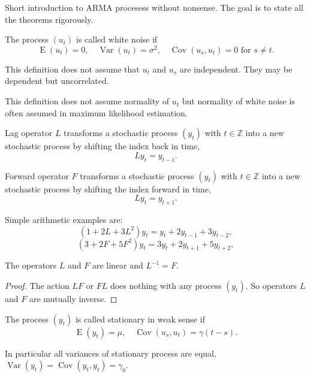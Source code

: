 \documentclass[12pt]{article} %
\DeclareMathOperator{\Cov}{Cov}
\DeclareMathOperator{\Var}{Var}
\DeclareMathOperator{\E}{E}
\def \ZZ{\mathbb{Z}}
\begin{document}
Short introduction to ARMA procesess without nonsense. 
The goal is to state all the theorems rigorously. 

\begin{definition}
The process $(u_t)$ is called white noise if 
\[
\E(u_t) = 0, \quad \Var(u_t) = \sigma^2, \quad \Cov(u_s, u_t) = 0 \text{ for } s\neq t.    
\]
\end{definition}

This definition does not assume that $u_t$ and $u_s$ are independent. 
They may be dependent but uncorrelated. 

This definition does not assume normality of $u_t$ but normality of white noise 
is often assumed in maximum likelihood estimation. 

\begin{definition}
    Lag operator $L$ transforms a stochastic process $(y_t)$ with $t\in \ZZ$ into a 
    new stochastic process by shifting the index back in time,
    \[
            L y_t = y_{t-1}.
    \]
\end{definition}

\begin{definition}
    Forward operator $F$ transforms a stochastic process $(y_t)$ with $t\in \ZZ$ into a 
    new stochastic process by shifting the index forward in time,
    \[
            L y_t = y_{t+1}.
    \]
\end{definition}


Simple arithmetic examples are:
\[
(1 + 2L + 3L^2)y_t = y_t + 2y_{t-1} + 3y_{t-2},   
\]
\[
(3 + 2F + 5F^2)y_t = 3y_t + 2y_{t+1} + 5y_{t+2},
\]

\begin{theorem}
    The operators $L$ and $F$ are linear and $L^{-1} = F$.
\end{theorem}

\begin{proof}
 The action $LF$ or $FL$ does nothing with any process $(y_t)$. 
 So operators $L$ and $F$ are mutually inverse.
\end{proof}


\begin{definition}
    The process $(y_t)$ is called stationary in weak sense if 
    \[
    \E(y_t) = \mu, \quad \Cov(u_s, u_t) = \gamma(t - s).    
    \]
\end{definition}

In particular all variances of stationary process are equal, $\Var(y_t) = \Cov(y_t, y_t) = \gamma_0$.
\end{document}
